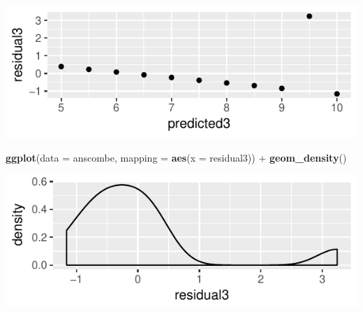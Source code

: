 \documentclass[]{article}
\newenvironment{Shaded}{\begin{snugshade}}{\end{snugshade}}
\newcommand{\KeywordTok}[1]{\textcolor[rgb]{0.13,0.29,0.53}{\textbf{{#1}}}}
\newcommand{\DataTypeTok}[1]{\textcolor[rgb]{0.13,0.29,0.53}{{#1}}}
\newcommand{\StringTok}[1]{\textcolor[rgb]{0.31,0.60,0.02}{{#1}}}
\newcommand{\NormalTok}[1]{{#1}}
\begin{document}
\begin{Shaded}
\end{Shaded}

\includegraphics{20180417_anscombe_residuals_files/figure-latex/unnamed-chunk-10-1.pdf}

\begin{Shaded}
\begin{Highlighting}[]
\KeywordTok{ggplot}\NormalTok{(}\DataTypeTok{data =} \NormalTok{anscombe, }\DataTypeTok{mapping =} \KeywordTok{aes}\NormalTok{(}\DataTypeTok{x =} \NormalTok{residual3)) +}
\StringTok{  }\KeywordTok{geom_density}\NormalTok{()}
\end{Highlighting}
\end{Shaded}

\includegraphics{20180417_anscombe_residuals_files/figure-latex/unnamed-chunk-11-1.pdf}
\end{document}
